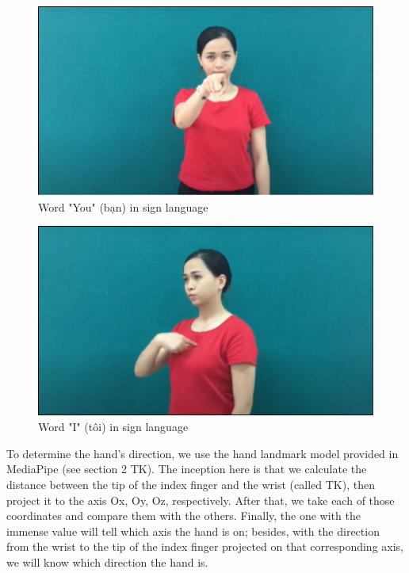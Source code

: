 \begin{figure}[H]
  \centering
  \includegraphics[width=\textwidth]{img/Chap4/WordYouInSignLanguage.png}
  \caption{Word "You" (bạn) in sign language}
  \label{fig:Chap4-WordYouInSignLanguage}
\end{figure}

\begin{figure}[H]
  \centering
  \includegraphics[width=\textwidth]{img/Chap4/WordIInSignLanguage.png}
  \caption{Word "I" (tôi) in sign language}
  \label{fig:Chap4-WordIInSignLanguage}
\end{figure}

To determine the hand's direction, we use the hand landmark model provided in MediaPipe (see section 2 TK). The inception here is that we calculate the distance between the tip of the index finger and the wrist (called TK), then project it to the axis Ox, Oy, Oz, respectively. After that, we take each of those coordinates and compare them with the others. Finally, the one with the immense value will tell which axis the hand is on; besides, with the direction from the wrist to the tip of the index finger projected on that corresponding axis, we will know which direction the hand is.

